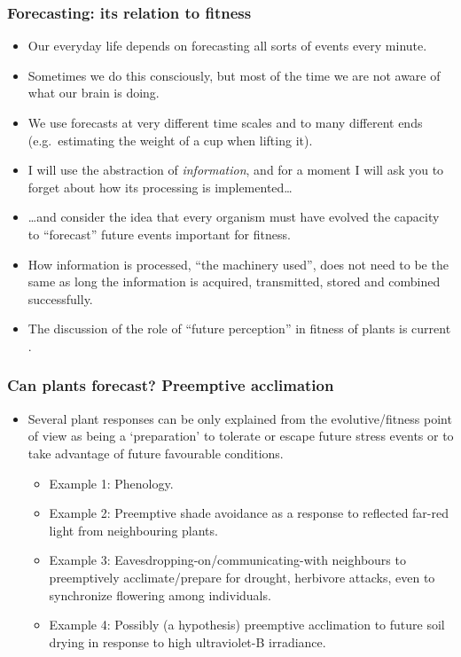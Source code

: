 \documentclass[10pt]{beamer}\usepackage[]{graphicx}\usepackage[]{xcolor}
\begin{document}
\begin{frame}%
  \frametitle{Forecasting: its relation to fitness}
  \begin{itemize}
\item Our everyday life depends on forecasting all sorts of events every minute.
    \item Sometimes we do this consciously, but most of the time we are not aware of what our brain is doing.
    \item We use forecasts at very different time scales and to many different ends (e.g.\ estimating the weight of a cup when lifting it).
    \item I will use the abstraction of \emph{information}, and for a moment I will ask you to forget about how its processing is implemented\ldots
    \item \ldots and consider the idea that every organism must have evolved the capacity to ``forecast'' future events important for fitness.
    \item How information is processed, ``the machinery used'', does not need to be the same as long the information is acquired, transmitted, stored and combined successfully.
    \item The discussion of the role of ``future perception'' in fitness of plants is current \autocite{Novoplansky2016a}.
  \end{itemize}
\end{frame}

\begin{frame}%
  \frametitle{Can plants forecast? Preemptive acclimation}
   \begin{itemize}
    \item Several plant responses can be only explained from the evolutive/fitness
    point of view as being a `preparation' to tolerate or escape future stress events or
    to take advantage of future favourable conditions.
    \begin{itemize}
    \item Example 1: Phenology.
    \item Example 2: Preemptive shade avoidance as a response to reflected far-red light from neighbouring
    plants.
    \item Example 3: Eavesdropping-on/communicating-with neighbours to preemptively acclimate/prepare
    for drought, herbivore attacks, even to synchronize flowering among individuals.
    \item Example 4: Possibly (a hypothesis) preemptive acclimation to future soil
    drying in response to high ultraviolet-B irradiance.
 \end{itemize}
  \end{itemize}
\end{frame}
\end{document}
